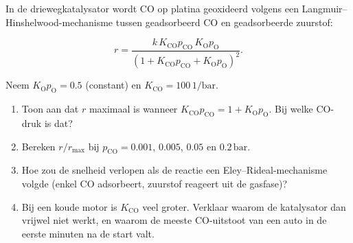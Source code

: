 \begin{oefening}
In de driewegkatalysator wordt CO op platina geoxideerd volgens een Langmuir--Hinshelwood-mechanisme tussen geadsorbeerd CO en geadsorbeerde zuurstof:

\[
r = \frac{k\,K_{\mathrm{CO}}p_{\mathrm{CO}}\,K_{\mathrm{O}}p_{\mathrm{O}}}{(1 + K_{\mathrm{CO}}p_{\mathrm{CO}} + K_{\mathrm{O}}p_{\mathrm{O}})^2}.
\]

Neem \(K_{\mathrm{O}}p_{\mathrm{O}} = 0.5\) (constant) en \(K_{\mathrm{CO}} = 100\,\mathrm{1/bar}\).

\begin{enumerate}
\item[(a)]
  Toon aan dat \(r\) maximaal is wanneer \(K_{\mathrm{CO}}p_{\mathrm{CO}} = 1 + K_{\mathrm{O}}p_{\mathrm{O}}\). Bij welke CO-druk is dat?
\item[(b)]
  Bereken \(r/r_{\max}\) bij \(p_{\mathrm{CO}} = 0.001\), \(0.005\), \(0.05\) en \(0.2\,\mathrm{bar}\).
\item[(c)]
  Hoe zou de snelheid verlopen als de reactie een Eley--Rideal-mechanisme volgde (enkel CO adsorbeert, zuurstof reageert uit de gasfase)?
\item[(d)]
  Bij een koude motor is \(K_{\mathrm{CO}}\) veel groter. Verklaar waarom de katalysator dan vrijwel niet werkt, en waarom de meeste CO-uitstoot van een auto in de eerste minuten na de start valt.
\end{enumerate}
\end{oefening}
